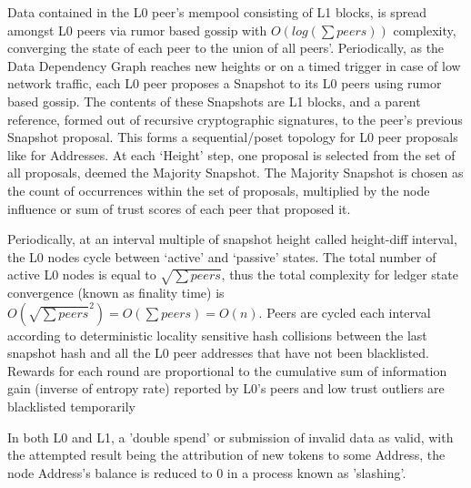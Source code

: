 \documentclass{article}
\begin{document}
Data contained in the L0 peer's mempool consisting of L1 blocks, is spread amongst L0 peers via rumor based gossip with $O(log(\sum peers))$ complexity, converging the state of each peer to the union of all peers'. Periodically, as the Data Dependency Graph reaches new heights or on a timed trigger in case of low network traffic, each L0 peer proposes a Snapshot to its L0 peers using rumor based gossip. The contents of these Snapshots are L1 blocks, and a parent reference, formed out of recursive cryptographic signatures, to the peer’s previous Snapshot proposal. This forms a sequential/poset topology for L0 peer proposals like for Addresses. At each ‘Height’ step, one proposal is selected from the set of all proposals, deemed the Majority Snapshot. The Majority Snapshot is chosen as the count of occurrences within the set of proposals, multiplied by the node influence or sum of trust scores of each peer that proposed it. 
	
Periodically, at an interval multiple of snapshot height called height-diff interval, the L0 nodes cycle between ‘active’ and ‘passive’ states. The total number of active L0 nodes is equal to $\sqrt{\sum peers}$, thus the total complexity for ledger state convergence (known as finality time) is $O(\sqrt{\sum peers}^2) = O(\sum peers)  = O(n)$. Peers are cycled each interval according to deterministic locality sensitive hash collisions between the last snapshot hash and all the L0 peer addresses that have not been blacklisted. Rewards for each round are proportional to the cumulative sum of information gain (inverse of entropy rate) reported by L0’s peers and low trust outliers are blacklisted temporarily 

In both L0 and L1, a 'double spend' or submission of invalid data as valid, with the attempted result being the attribution of new tokens to some Address, the node Address's balance is reduced to 0 in a process known as 'slashing'.
\end{document}
